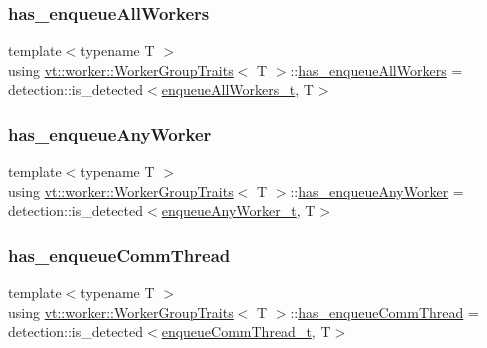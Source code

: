 \subsubsection{\texorpdfstring{has\+\_\+enqueue\+All\+Workers}{has\_enqueueAllWorkers}}
{\footnotesize\ttfamily template$<$typename T $>$ \\
using \hyperlink{structvt_1_1worker_1_1_worker_group_traits}{vt\+::worker\+::\+Worker\+Group\+Traits}$<$ T $>$\+::\hyperlink{structvt_1_1worker_1_1_worker_group_traits_ae2e54acc294e8701af36511ffef93af3}{has\+\_\+enqueue\+All\+Workers} =  detection\+::is\+\_\+detected$<$\hyperlink{structvt_1_1worker_1_1_worker_group_traits_a408b704c65e78ddd4f90963eb4e48cf0}{enqueue\+All\+Workers\+\_\+t}, T$>$}

\mbox{\label{structvt_1_1worker_1_1_worker_group_traits_aab410614bd95041609fc12566b34d407}} 
\subsubsection{\texorpdfstring{has\+\_\+enqueue\+Any\+Worker}{has\_enqueueAnyWorker}}
{\footnotesize\ttfamily template$<$typename T $>$ \\
using \hyperlink{structvt_1_1worker_1_1_worker_group_traits}{vt\+::worker\+::\+Worker\+Group\+Traits}$<$ T $>$\+::\hyperlink{structvt_1_1worker_1_1_worker_group_traits_aab410614bd95041609fc12566b34d407}{has\+\_\+enqueue\+Any\+Worker} =  detection\+::is\+\_\+detected$<$\hyperlink{structvt_1_1worker_1_1_worker_group_traits_a2eaad9ce43633046cc98b466dc1088ac}{enqueue\+Any\+Worker\+\_\+t}, T$>$}

\mbox{\label{structvt_1_1worker_1_1_worker_group_traits_ad12299517527c3a0b977d06da86a637e}} 
\subsubsection{\texorpdfstring{has\+\_\+enqueue\+Comm\+Thread}{has\_enqueueCommThread}}
{\footnotesize\ttfamily template$<$typename T $>$ \\
using \hyperlink{structvt_1_1worker_1_1_worker_group_traits}{vt\+::worker\+::\+Worker\+Group\+Traits}$<$ T $>$\+::\hyperlink{structvt_1_1worker_1_1_worker_group_traits_ad12299517527c3a0b977d06da86a637e}{has\+\_\+enqueue\+Comm\+Thread} =  detection\+::is\+\_\+detected$<$\hyperlink{structvt_1_1worker_1_1_worker_group_traits_a576f8d9a2343be8a876df90d1eb9c955}{enqueue\+Comm\+Thread\+\_\+t}, T$>$}

